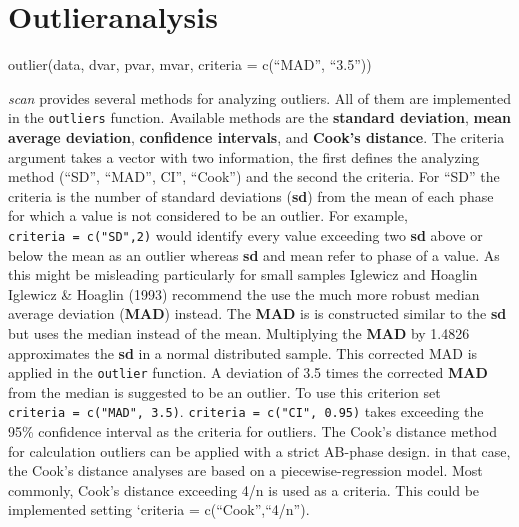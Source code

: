 \documentclass[
  letterpaper,
  DIV=11,
  numbers=noendperiod]{scrreprt}
\begin{document}
\hypertarget{outlieranalysis}{%
\section{Outlieranalysis}\label{outlieranalysis}}

\begin{tcolorbox}[enhanced jigsaw, toprule=.15mm, colframe=quarto-callout-tip-color-frame, left=2mm, colback=white, breakable, bottomrule=.15mm, arc=.35mm, rightrule=.15mm, leftrule=.75mm, opacityback=0]
\begin{minipage}[t]{5.5mm}
\textcolor{quarto-callout-tip-color}{\faLightbulb}
\end{minipage}%
\begin{minipage}[t]{\textwidth - 5.5mm}
outlier(data, dvar, pvar, mvar, criteria = c(``MAD'',
``3.5''))\end{minipage}%
\end{tcolorbox}

\emph{scan} provides several methods for analyzing outliers. All of them
are implemented in the \texttt{outliers} function. Available methods are
the \textbf{standard deviation}, \textbf{mean average deviation},
\textbf{confidence intervals}, and \textbf{Cook's distance}. The
criteria argument takes a vector with two information, the first defines
the analyzing method (``SD'', ``MAD'', CI'', ``Cook'') and the second
the criteria. For ``SD'' the criteria is the number of standard
deviations (\textbf{sd}) from the mean of each phase for which a value
is not considered to be an outlier. For example,
\texttt{criteria\ =\ c("SD",2)} would identify every value exceeding two
\textbf{sd} above or below the mean as an outlier whereas \textbf{sd}
and mean refer to phase of a value. As this might be misleading
particularly for small samples Iglewicz and Hoaglin Iglewicz \& Hoaglin
(1993) recommend the use the much more robust median average deviation
(\textbf{MAD}) instead. The \textbf{MAD} is is constructed similar to
the \textbf{sd} but uses the median instead of the mean. Multiplying the
\textbf{MAD} by 1.4826 approximates the \textbf{sd} in a normal
distributed sample. This corrected MAD is applied in the
\texttt{outlier} function. A deviation of 3.5 times the corrected
\textbf{MAD} from the median is suggested to be an outlier. To use this
criterion set \texttt{criteria\ =\ c("MAD",\ 3.5)}.
\texttt{criteria\ =\ c("CI",\ 0.95)} takes exceeding the 95\% confidence
interval as the criteria for outliers. The Cook's distance method for
calculation outliers can be applied with a strict AB-phase design. in
that case, the Cook's distance analyses are based on a
piecewise-regression model. Most commonly, Cook's distance exceeding 4/n
is used as a criteria. This could be implemented setting `criteria =
c(``Cook'',``4/n'').
\end{document}
